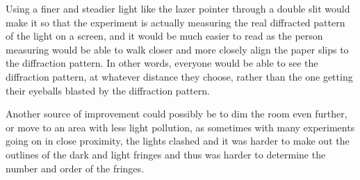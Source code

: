 \documentclass[12pt]{article}
\begin{document}
Using a finer and steadier light like the lazer pointer through a double slit would make it so that the experiment is actually measuring the real diffracted pattern of the light on a screen, and it would be much easier to read as the person measuring would be able to walk closer and more closely align the paper slips to the diffraction pattern. In other words, everyone would be able to see the diffraction pattern, at whatever distance they choose, rather than the one getting their eyeballs blasted by the diffraction pattern.

Another source of improvement could possibly be to dim the room even further, or move to an area with less light pollution, as sometimes with many experiments going on in close proximity, the lights clashed and it was harder to make out the outlines of the dark and light fringes and thus was harder to determine the number and order of the fringes.
\end{document}
